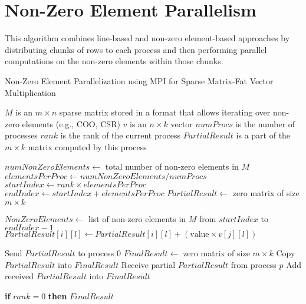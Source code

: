 \documentclass[12pt,oneside]{book} %
\begin{document}
\newpage
\section{Non-Zero Element Parallelism}
This algorithm combines line-based and non-zero element-based approaches by
distributing chunks of rows to each process and then performing parallel
computations on the non-zero elements within those chunks.

\begin{algorithm}
    \caption{Non-Zero Element Parallelization using MPI for Sparse Matrix-Fat Vector Multiplication}
    \begin{algorithmic}
        \Require $M$ is an $m \times n$ sparse matrix stored in a format that allows iterating over non-zero elements (e.g., COO, CSR)
        \Require $v$ is an $n \times k$ vector
        \Require $numProcs$ is the number of processes
        \Require $rank$ is the rank of the current process
        \Ensure  $PartialResult$ is a part of the $m \times k$ matrix computed by this process

        \State $numNonZeroElements \gets$ total number of non-zero elements in $M$
        \State $elementsPerProc \gets numNonZeroElements / numProcs$
        \State $startIndex \gets rank \times elementsPerProc$
        \State $endIndex \gets startIndex + elementsPerProc$
        \State $PartialResult \gets$ zero matrix of size $m \times k$

        \State $NonZeroElements \gets$ list of non-zero elements in $M$ from $startIndex$ to $endIndex - 1$
                \State $PartialResult[i][l] \gets PartialResult[i][l] + (\text{value} \times v[j][l])$
            \EndFor
        \EndFor

            \State Send $PartialResult$ to process $0$
        \Else
            \State $FinalResult \gets$ zero matrix of size $m \times k$
            \State Copy $PartialResult$ into $FinalResult$
                \State Receive partial $PartialResult$ from process $p$
                \State Add received $PartialResult$ into $FinalResult$
            \EndFor
        \EndIf

        \State \textbf{if} $rank = 0$ \textbf{then} \Return $FinalResult$
    \end{algorithmic}
\end{algorithm}
\end{document}
